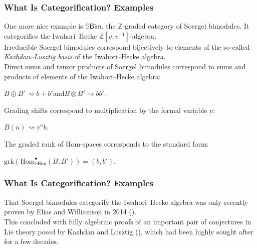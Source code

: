 \documentclass{beamer}
\newcommand{\textcat}[1]{\mathrm{\textsf{#1}}}
\newcommand*{\emphasis}[1]{\textcolor{structure}{\em #1}}
\begin{document}
\begin{frame}
\frametitle{What Is Categorification? Examples}
One more nice example is $\mathbb{S}\textsf{Bim}$, the $\mathbb{Z}$-graded category of Soergel bimodules. It categorifies the Iwahori--Hecke $\mathbb{Z}[v, v^{-1}]$-algebra.\\[2ex]
Irreducible Soergel bimodules correspond bijectively to elements of the so-called \emphasis{Kazhdan--Lusztig basis} of the Iwahori--Hecke algebra.\\[2ex]
Direct sums and tensor products of Soergel bimodules correspond to sums and products of elements of the Iwahori--Hecke algebra:
\begin{center}$B \oplus B' \rightsquigarrow b + b'$\quad and\quad $B \otimes B' \rightsquigarrow bb'$.\end{center}
Grading shifts correspond to multiplication by the formal variable $v$:
\begin{center}$B(n) \rightsquigarrow v^nb$.\end{center}
The graded rank of Hom-spaces corresponds to the standard form:
\begin{center}$\mathrm{grk}(\mathrm{Hom}^\bullet_{\mathbb{S}\textcat{Bim}}(B, B')) = (b, b')$.\end{center}
\end{frame}

\begin{frame}
\frametitle{What Is Categorification? Examples}
That Soergel bimodules categorify the Iwahori--Hecke algebra was only recently proven by Elias and Williamson in 2014 (\textcolor{structure}{\cite{EW14}}).\\[2ex]
This concluded with fully algebraic proofs of an important pair of conjectures in Lie theory posed by Kazhdan and Lusztig (\textcolor{structure}{\cite{KL79}}), which had been highly sought after for a few decades.
\end{frame}
\end{document}
